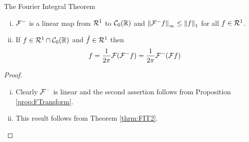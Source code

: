 \begin{section}{The Fourier Integral Theorem}
\begin{cor}\label{cor:FIT2}
	\begin{enumerate}[i)]
		\item
			$\fmtransform[]$ is a linear map from $\absint$ to
			$\ctszeror$ and $\supnorm{\fmtransform} \leq 
			\norm[1]{f}$ for all $f \in \absint$.
		\item
			If $f \in \absint \cap \ctszeror$ and $\f \in
			\absint$ then
				\begin{displaymath}
					f = \frac{1}{2\pi}\ftransform[(\fmtransform)]
						= \frac{1}{2\pi}\fmtransform[(\ftransform)]
				\end{displaymath}
	\end{enumerate}
\end{cor}

\begin{proof}
	\begin{enumerate}[i)]
		\item
			Clearly $\fmtransform[]$ is linear and the second
			assertion follows from Proposition \ref{prop:FTransform}.
		\item
			This result follows from Theorem \ref{thrm:FIT2}.
	\end{enumerate}
\end{proof}

\end{section}